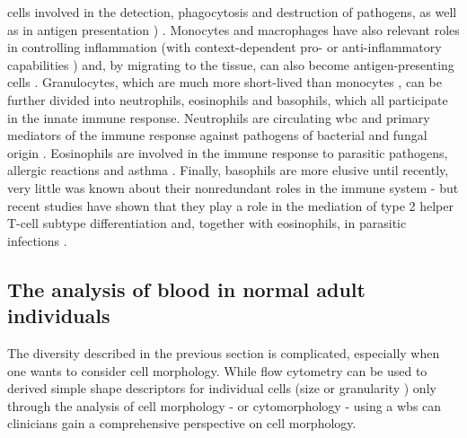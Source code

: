 cells involved in the detection, phagocytosis and destruction of pathogens, as well as in antigen presentation \cite{Mills2012-rc}) \cite{Jakubzick2017-is}. Monocytes and macrophages have also relevant roles in controlling inflammation (with context-dependent pro- or anti-inflammatory capabilities \cite{Rivollier2012-we,Bain2013-qe}) and, by migrating to the tissue, can also become antigen-presenting cells \cite{Jakubzick2013-az,Plantinga2013-kn}. Granulocytes, which are much more short-lived than monocytes \cite{Athens1961-cl}, can be further divided into neutrophils, eosinophils and basophils, which all participate in the innate immune response. Neutrophils are circulating \ac{wbc} and primary mediators of the immune response against pathogens of bacterial and fungal origin \cite{Malech2014-dm}. Eosinophils are involved in the immune response to parasitic pathogens, allergic reactions and asthma \cite{Uhm2012-ja,Huang2016-br}. Finally, basophils are more elusive until recently, very little was known about their nonredundant roles in the immune system \cite{Miyake2017-rh,Karasuyama2011-ws} - but recent studies have shown that they play a role in the mediation of type 2 helper T-cell subtype differentiation \cite{Hida2005-lj,Oh2007-yr} and, together with eosinophils, in parasitic infections \cite{Karasuyama2011-ws,Huang2016-br}.

\begin{figure}
  \label{fig:haema}
\end{figure}

\subsection{The analysis of blood in normal adult individuals}

The diversity described in the previous section is complicated, especially when one wants to consider cell morphology. While flow cytometry can be used to derived simple shape descriptors for individual cells (size or granularity \cite{Shapiro2005-ud}) only through the analysis of cell morphology - or cytomorphology - using a \ac{wbs} can clinicians gain a comprehensive perspective on cell morphology.

